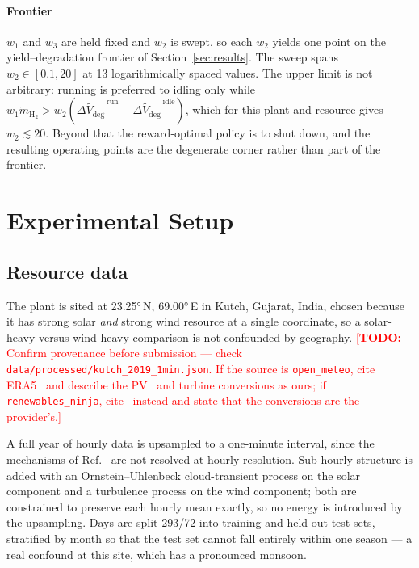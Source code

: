 \documentclass[conference]{IEEEtran}
\newcommand{\TODO}[1]{\textcolor{red}{[\textbf{TODO:} #1]}}
\newcommand{\dVdeg}{\Delta V_{\mathrm{deg}}}
\begin{document}
\paragraph{Frontier}
$w_1$ and $w_3$ are held fixed and $w_2$ is swept, so each $w_2$ yields one point on the
yield--degradation frontier of Section~\ref{sec:results}. The sweep spans
$w_2 \in [0.1, 20]$ at 13 logarithmically spaced values. The upper limit is not arbitrary:
running is preferred to idling only while
$w_1\tilde m_{\mathrm{H_2}} > w_2(\widetilde{\dVdeg}^{\,\mathrm{run}} -
\widetilde{\dVdeg}^{\,\mathrm{idle}})$, which for this plant and resource gives
$w_2 \lesssim 20$. Beyond that the reward-optimal policy is to shut down, and the resulting
operating points are the degenerate corner rather than part of the frontier.

\section{Experimental Setup}\label{sec:setup}

\subsection{Resource data}
The plant is sited at \ang{23.25}\,N, \ang{69.00}\,E in Kutch, Gujarat, India, chosen
because it has strong solar \emph{and} strong wind resource at a single coordinate, so a
solar-heavy versus wind-heavy comparison is not confounded by geography.
\TODO{Confirm provenance before submission --- check
\texttt{data/processed/kutch\_2019\_1min.json}. If the source is \texttt{open\_meteo},
cite ERA5~\cite{hersbach2020era5} and describe the PV~\cite{dobos2014pvwatts} and turbine
conversions as ours; if \texttt{renewables\_ninja}, cite~\cite{pfenninger2016} instead and
state that the conversions are the provider's.}

A full year of hourly data is upsampled to a one-minute interval, since the mechanisms of
Ref.~\cite{intermittency2025} are not resolved at hourly resolution. Sub-hourly structure
is added with an Ornstein--Uhlenbeck cloud-transient process on the solar component and a
turbulence process on the wind component; both are constrained to preserve each hourly
mean exactly, so no energy is introduced by the upsampling. Days are split
\num{293}/\num{72} into training and held-out test sets, stratified by month so that the
test set cannot fall entirely within one season --- a real confound at this site, which has
a pronounced monsoon.
\end{document}
